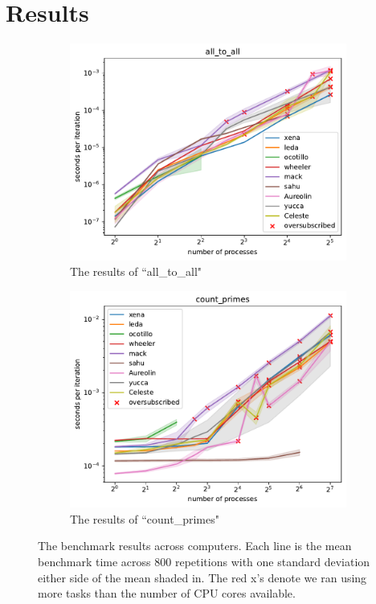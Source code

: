 \documentclass{article}
\newcommand\todoChris[1]{\todo[author=Chris,color=orange,inline]{#1}}
\begin{document}
\section{Results}
\todoChris{}

\begin{figure}[h]
    \centering
    \begin{subfigure}[b]{0.49\textwidth}
         \centering
         \includegraphics[width=\textwidth]{figures/final/all_to_all.pdf}
         \caption{The results of ``all\_to\_all"}
         \label{fig:all_to_all}
     \end{subfigure}
     \hfill
     \begin{subfigure}[b]{0.49\textwidth}
         \centering
         \includegraphics[width=\textwidth]{figures/final/count_primes.pdf}
         \caption{The results of ``count\_primes"}
         \label{fig:count_primes}
     \end{subfigure}
     \hfill
    \caption{The benchmark results across computers. Each line is the mean benchmark time across 800 repetitions with one standard deviation either side of the mean shaded in. The red x's denote we ran using more tasks than the number of CPU cores available. }
    \label{fig:direct}
\end{figure}
\end{document}
